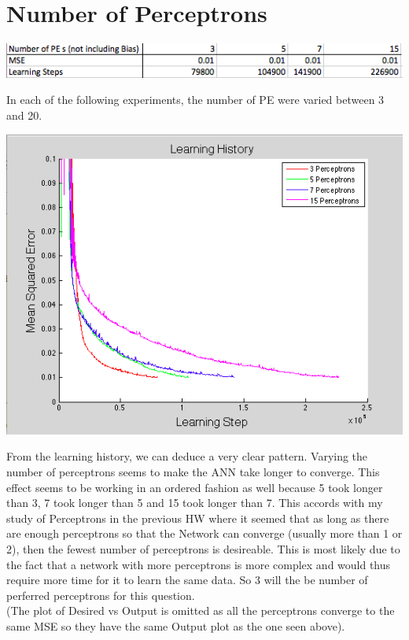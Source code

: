 \documentclass[epsfig]{article}
\begin{document}
\section*{Number of Perceptrons}
\begin{center}
\includegraphics[scale=0.9]{pic10}
\end{center}
In each of the following experiments, the number of PE were varied between 3 and 20.
\newline
\begin{center}
\includegraphics[scale=0.7]{pic11}
\end{center}
From the learning history, we can deduce a very clear pattern. Varying the number of perceptrons seems to make the ANN take longer to converge. This effect seems to be working in an ordered fashion as well because 5 took longer than 3, 7 took longer than 5 and 15 took longer than 7. This accords with my study of Perceptrons in the previous HW where it seemed that as long as there are enough perceptrons so that the Network can converge (usually more than 1 or 2), then the fewest number of perceptrons is desireable. This is most likely due to the fact that a network with more perceptrons is more complex and would thus require more time for it to learn the same data. So 3 will the be number of perferred perceptrons for this question.\\
 
(The plot of Desired vs Output is omitted as all the perceptrons converge to the same MSE so they have the same Output plot as the one seen above).
\end{document}
